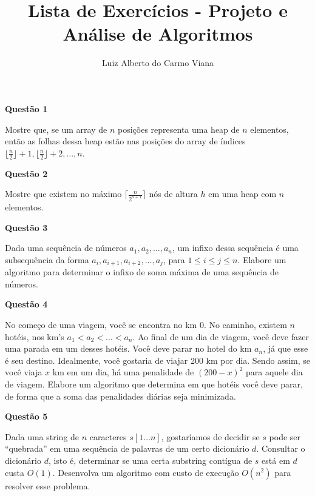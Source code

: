 \documentclass[]{article}
\title{Lista de Exercícios - Projeto e Análise de Algoritmos}
\author{Luiz Alberto do Carmo Viana}
\begin{document}
\maketitle

\vspace{\baselineskip}

\textbf{Questão 1}

Mostre que, se um array de $n$ posições representa uma heap de $n$
elementos, então as folhas dessa heap estão nas posições do array de
índices
$\lfloor \frac{n}{2} \rfloor + 1, \lfloor \frac{n}{2} \rfloor + 2,
\dots, n$.

\vspace{\baselineskip}

\textbf{Questão 2}

Mostre que existem no máximo $\lceil \frac{n}{2^{h + 1}} \rceil$ nós
de altura $h$ em uma heap com $n$ elementos.

\vspace{\baselineskip}

\textbf{Questão 3}

Dada uma sequência de números $a_1, a_2, \dots, a_n$, um infixo dessa
sequência é uma subsequência da forma
$a_i, a_{i + 1}, a_{i + 2}, \dots, a_j$, para
$1 \leq i \leq j \leq n$.  Elabore um algoritmo para determinar o
infixo de soma máxima de uma sequência de números.

\vspace{\baselineskip}

\textbf{Questão 4}

No começo de uma viagem, você se encontra no km $0$.  No caminho,
existem $n$ hotéis, nos km's $a_1 < a_2 < \dots < a_n$.  Ao final de
um dia de viagem, você deve fazer uma parada em um desses hotéis.
Você deve parar no hotel do km $a_n$, já que esse é seu destino.
Idealmente, você gostaria de viajar 200 km por dia.  Sendo assim, se
você viaja $x$ km em um dia, há uma penalidade de $(200 - x)^2$ para
aquele dia de viagem.  Elabore um algoritmo que determina em que
hotéis você deve parar, de forma que a soma das penalidades diárias
seja minimizada.

\vspace{\baselineskip}

\textbf{Questão 5}

Dada uma string de $n$ caracteres $s[1 \dots n]$, gostaríamos de
decidir se $s$ pode ser ``quebrada'' em uma sequência de palavras de
um certo dicionário $d$.  Consultar o dicionário $d$, isto é,
determinar se uma certa substring contígua de $s$ está em $d$ custa
$O(1)$.  Desenvolva um algoritmo com custo de execução $O(n^2)$ para
resolver esse problema.
\end{document}
